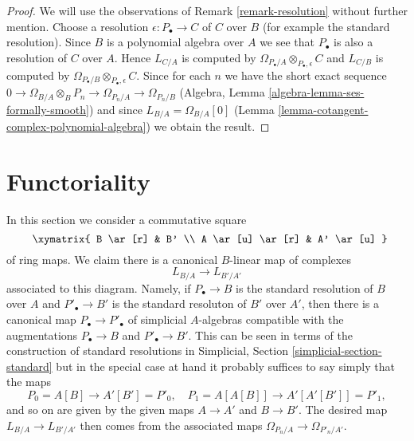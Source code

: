 \begin{proof}
We will use the observations of Remark \ref{remark-resolution}
without further mention. Choose a resolution $\epsilon : P_\bullet \to C$
of $C$ over $B$ (for example the standard resolution). Since $B$ is a
polynomial algebra over $A$ we see that $P_\bullet$ is also a resolution of
$C$ over $A$. Hence $L_{C/A}$ is computed by
$\Omega_{P_\bullet/A} \otimes_{P_\bullet, \epsilon} C$
and $L_{C/B}$ is computed by
$\Omega_{P_\bullet/B} \otimes_{P_\bullet, \epsilon} C$.
Since for each $n$ we have the short exact sequence
$0 \to \Omega_{B/A} \otimes_B P_n \to \Omega_{P_n/A} \to \Omega_{P_n/B}$
(Algebra, Lemma \ref{algebra-lemma-ses-formally-smooth})
and since $L_{B/A} = \Omega_{B/A}[0]$
(Lemma \ref{lemma-cotangent-complex-polynomial-algebra})
we obtain the result.
\end{proof}






\section{Functoriality}
\label{section-functoriality}

\noindent
In this section we consider a commutative square
\begin{equation}
\label{equation-commutative-square}
\vcenter{
\xymatrix{
B \ar[r] & B' \\
A \ar[u] \ar[r] & A' \ar[u]
}
}
\end{equation}
of ring maps. We claim there is a canonical $B$-linear map of complexes
$$
L_{B/A} \longrightarrow L_{B'/A'}
$$
associated to this diagram. Namely, if $P_\bullet \to B$ is the
standard resolution of $B$ over $A$ and $P'_\bullet \to B'$ is the
standard resoluton of $B'$ over $A'$, then there is a canonical map
$P_\bullet \to P'_\bullet$
of simplicial $A$-algebras compatible with the augmentations
$P_\bullet \to B$ and $P'_\bullet \to B'$. This can be seen in terms
of the construction of standard resolutions in
Simplicial, Section \ref{simplicial-section-standard}
but in the special case at hand it probably suffices to say simply
that the maps
$$
P_0 = A[B] \longrightarrow A'[B'] = P'_0,\quad
P_1 = A[A[B]] \longrightarrow A'[A'[B']] = P'_1,
$$
and so on are given by the given maps $A \to A'$ and $B \to B'$.
The desired map $L_{B/A} \to L_{B'/A'}$ then comes from the associated
maps $\Omega_{P_n/A} \to \Omega_{P'_n/A'}$.

